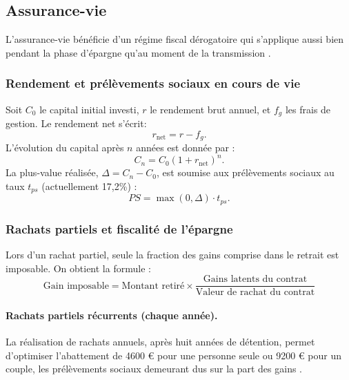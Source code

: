\subsection{Assurance-vie}
\label{sec:assurance_vie}

L'assurance-vie bénéficie d'un régime fiscal dérogatoire qui s'applique aussi bien pendant la phase d'épargne qu'au moment de la transmission \cite{cgi_990i, cgi_757b, bofip_mutations_av}.

\subsubsection{Rendement et prélèvements sociaux en cours de vie}
\label{sec:rendement_prelevements}

Soit \(C_0\) le capital initial investi, \(r\) le rendement brut annuel, et \(f_g\) les frais de gestion. Le rendement net s'écrit:
\begin{equation}
    r_{\text{net}} = r - f_g.
\end{equation}
L'évolution du capital après \(n\) années est donnée par :
\begin{equation}
    C_n = C_0(1+r_{\text{net}})^n.
\end{equation}
La plus-value réalisée, \(\Delta = C_n - C_0\), est soumise aux prélèvements sociaux au taux \(t_{ps}\) (actuellement 17,2\%) \cite{bofip_ps_av}:
\begin{equation}
    PS = \max(0, \Delta) \cdot t_{ps}.
\end{equation}

\subsubsection{Rachats partiels et fiscalité de l'épargne}
\label{sec:rachats_partiels}

Lors d'un rachat partiel, seule la fraction des gains comprise dans le retrait est imposable. On obtient la formule :
\begin{equation}
    \text{Gain imposable} = \text{Montant retiré} \times \frac{\text{Gains latents du contrat}}{\text{Valeur de rachat du contrat}}
\end{equation}

\paragraph{Rachats partiels récurrents (chaque année).} La réalisation de rachats annuels, après huit années de détention, permet d'optimiser l'abattement de 4600 € pour une personne seule ou 9200 € pour un couple, les prélèvements sociaux demeurant dus sur la part des gains \cite{cgi_990i, cgi_757b}.

